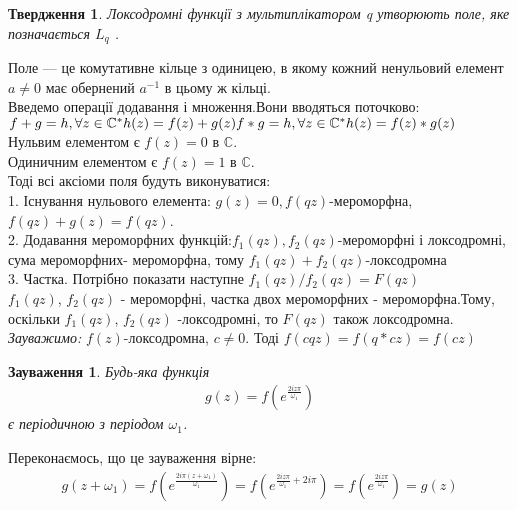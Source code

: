 \documentclass[12pt,a4paper]{article}
\begin{document}
\newtheorem{twerd}{Твердження}
\begin{twerd}
 Локсодромні функції з мультиплікатором \textit{q} утворюють поле, яке позначається $L_{q}$ 
 \label{L_{q}}.
 \end{twerd} 
Поле — це комутативне кільце з одиницею, в якому кожний ненульовий елемент $a\neq 0$ має обернений $a^{-1}$ в цьому ж кільці.\\
Введемо операції додавання і множення.Вони вводяться поточково:\\
$f+g=h, \forall z \in \mathbb{C}^{*} h(z)=f(z)+g(z)\\
f*g=h, \forall z \in \mathbb{C}^{*} h(z)=f(z)*g(z)$\\
Нульвим елементом є $f(z)=0$ в $\mathbb{C}$.\\
Одиничним елементом є $f(z)=1$ в $\mathbb{C}$.\\
Тоді всі аксіоми поля будуть виконуватися:\\
1. Існування нульового елемента: $g(z)=0, f(qz)$-мероморфна, $f(qz)+g(z)=f(qz)$.\\
2. Додавання мероморфних функцій:$f_{1}(qz),f_{2}(qz)$-мероморфні і локсодромні, сума мероморфних- мероморфна, тому $f_{1}(qz)+f_{2}(qz)$-локсодромна \\
3. Частка. Потрібно показати наступне $f_{1}(qz)/f_{2}(qz)=F(qz)$\\
$f_{1}(qz)$, $f_{2}(qz)$ - мероморфні, частка двох мероморфних - мероморфна.Тому, оскільки $f_{1}(qz)$, $f_{2}(qz)$ -локсодромні, то $ F(qz)$ також локсодромна.\\
\emph{Зауважимо:} $f(z)$-локсодромна, $c \neq 0$. Тоді  $f(cqz)=f(q*cz)=f(cz)$
\vspace{1,5cm}

\newtheorem{zauv}{Зауваження}
\begin{zauv} 
Будь-яка функція 
\begin{equation}\label{eq1}
\begin{array}{l}
g(z)=f(e^{\frac{2iz\pi}{\omega_{1}}})
\end{array}
\end{equation}
є періодичною з періодом $\omega_{1}$.
\end{zauv}
Переконаємось, що це зауваження вірне: 
\[\begin{array}{l}
g(  z+\omega_{1}  ) = f(  e^{\frac{2i\pi (z+\omega_{1})}{\omega_{1}} }  ) =  f(  e^{\frac{2iz\pi }{ \omega_{1}}  +2i\pi } ) = f(  e^{\frac {2iz\pi}{\omega_{1}}} ) = g(z) 
\end{array}\]
\vspace{1cm}
\end{document}
